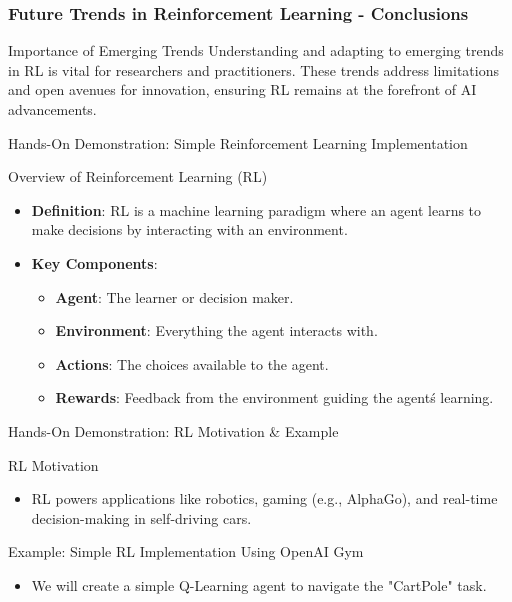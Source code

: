 \documentclass[aspectratio=169]{beamer}
\begin{document}
\begin{frame}[fragile]
    \frametitle{Future Trends in Reinforcement Learning - Conclusions}
    \begin{block}{Importance of Emerging Trends}
        Understanding and adapting to emerging trends in RL is vital for researchers and practitioners. 
        These trends address limitations and open avenues for innovation, ensuring RL remains at the forefront of AI advancements.
    \end{block}
\end{frame}

\begin{frame}[fragile]{Hands-On Demonstration: Simple Reinforcement Learning Implementation}
    \begin{block}{Overview of Reinforcement Learning (RL)}
        \begin{itemize}
            \item \textbf{Definition}: RL is a machine learning paradigm where an agent learns to make decisions by interacting with an environment.
            \item \textbf{Key Components}:
            \begin{itemize}
                \item \textbf{Agent}: The learner or decision maker.
                \item \textbf{Environment}: Everything the agent interacts with.
                \item \textbf{Actions}: The choices available to the agent.
                \item \textbf{Rewards}: Feedback from the environment guiding the agent\'s learning.
            \end{itemize}
        \end{itemize}
    \end{block}
\end{frame}

\begin{frame}[fragile]{Hands-On Demonstration: RL Motivation & Example}
    \begin{block}{RL Motivation}
        \begin{itemize}
            \item RL powers applications like robotics, gaming (e.g., AlphaGo), and real-time decision-making in self-driving cars.
        \end{itemize}
    \end{block}

    \begin{block}{Example: Simple RL Implementation Using OpenAI Gym}
        \begin{itemize}
            \item We will create a simple Q-Learning agent to navigate the "CartPole" task.
        \end{itemize}
    \end{block}
\end{frame}
\end{document}
